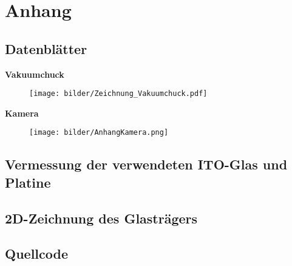 \chapter{Anhang}

\section{Datenblätter}
\label{an:Daten}
{\bf Vakuumchuck}
\begin{figure}[H]
    \centering
    \texttt{[image: bilder/Zeichnung\_Vakuumchuck.pdf]}
    \label{an:Vakuumchuck}
\end{figure}
\clearpage

{\bf Kamera}
\begin{figure}[H]
    \centering
    \texttt{[image: bilder/AnhangKamera.png]}
    \label{an:AnhangKamera}
\end{figure}
\clearpage

\label{pdf:325}

\label{pdf:336}

\section{Vermessung der verwendeten ITO-Glas und Platine}\label{sec:vermessung}
\clearpage

\section{2D-Zeichnung des Glasträgers}\label{sec:2D}
\clearpage

\section{Quellcode}\label{sec:Quellcode}


